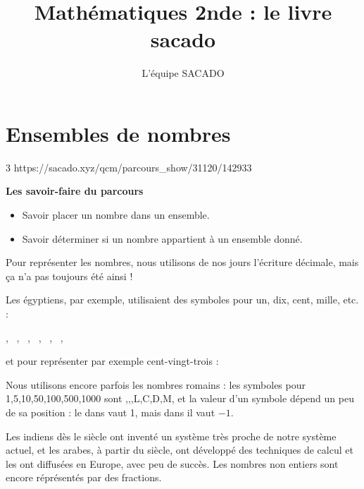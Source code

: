 



\usepackage{hieroglf}
\usepackage{romanbar}

\title{Mathématiques 2nde  : le livre sacado}
\author{L'équipe SACADO}




\chapter{Ensembles de nombres}{3}
{https://sacado.xyz/qcm/parcours_show/31120/142933}
{
 \begin{CpsCol}
	\textbf{Les savoir-faire du parcours}
 	\begin{itemize}
 		\item Savoir placer un nombre dans un ensemble.
		\item Savoir déterminer si un nombre appartient à un ensemble donné.
 	\end{itemize}
 \end{CpsCol}

\begin{His}

 Pour représenter les nombres, nous utilisons de nos jours l'écriture
 décimale, mais ça n'a pas toujours été ainsi !

 Les égyptiens, par exemple, utilisaient des symboles pour un, dix,
 cent, mille, etc. :

\centerline{\Huge
{\pmhgfamily\Hone},~
{\pmhgfamily\Hten},~   
{\pmhgfamily\Hhundred},~
{\pmhgfamily\Hthousand},~
{\pmhgfamily\HXthousand},~
{\pmhgfamily\HCthousand},~
{\pmhgfamily\Hmillion}
}
 et pour représenter par exemple cent-vingt-trois :

\centerline{\Huge
{\pmhgfamily\Hone\Hone\Hone}{\pmhgfamily\Hten}{\pmhgfamily\Hten}{\pmhgfamily\Hhundred}
}

 Nous utilisons encore parfois les nombres romains : les symboles
 pour 1,5,10,50,100,500,1000 
 sont ,,,L,C,D,M,
 et la valeur d'un symbole dépend un peu de sa position :
 le  dans  vaut 1, mais dans  il vaut $-1$.
 
\parbox[t]{0.6\textwidth}{ Les indiens dès le \ieme siècle ont inventé un système très proche de
 notre système actuel, et les arabes, à partir du \ieme siècle,
 ont développé des techniques de calcul et les ont diffusées en Europe,
 avec peu de succès. Les nombres non entiers sont encore réprésentés par des fractions.

}
\end{His}}
